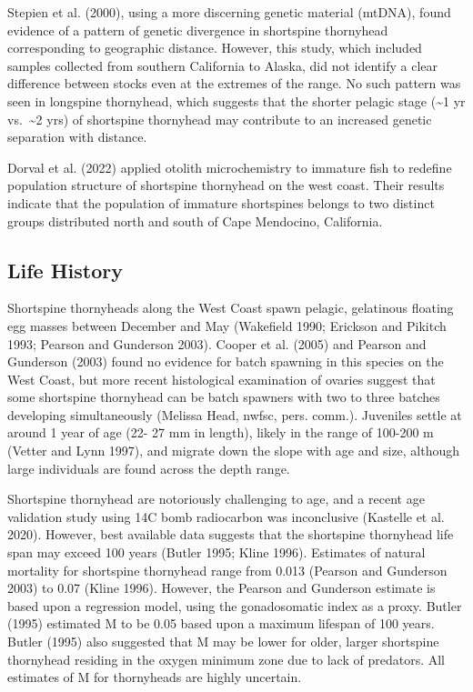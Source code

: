 \documentclass[11pt,
  english,
  letterpaper,
]{article}
\begin{document}
Stepien et al. (2000), using a more discerning genetic material (mtDNA), found evidence of a pattern of genetic divergence in shortspine thornyhead corresponding to geographic distance. However, this study, which included samples collected from southern California to Alaska, did not identify a clear difference between stocks even at the extremes of the range. No such pattern was seen in longspine thornyhead, which suggests that the shorter pelagic stage (\textasciitilde1 yr vs.~\textasciitilde2 yrs) of shortspine thornyhead may contribute to an increased genetic separation with distance.

Dorval et al. (2022) applied otolith microchemistry to immature fish to redefine population structure of shortspine thornyhead on the west coast. Their results indicate that the population of immature shortspines belongs to two distinct groups distributed north and south of Cape Mendocino, California.

\hypertarget{life-history}{%
\subsection{Life History}\label{life-history}}

Shortspine thornyheads along the West Coast spawn pelagic, gelatinous floating egg masses between December and May (Wakefield 1990; Erickson and Pikitch 1993; Pearson and Gunderson 2003). Cooper et al. (2005) and Pearson and Gunderson (2003) found no evidence for batch spawning in this species on the West Coast, but more recent histological examination of ovaries suggest that some shortspine thornyhead can be batch spawners with two to three batches developing simultaneously (Melissa Head, \gls{nwfsc}, pers. comm.). Juveniles settle at around 1 year of age (22- 27 mm in length), likely in the range of 100-200 m (Vetter and Lynn 1997), and migrate down the slope with age and size, although large individuals are found across the depth range.

Shortspine thornyhead are notoriously challenging to age, and a recent age validation study using 14C bomb radiocarbon was inconclusive (Kastelle et al. 2020). However, best available data suggests that the shortspine thornyhead life span may exceed 100 years (Butler 1995; Kline 1996). Estimates of natural mortality for shortspine thornyhead range from 0.013 (Pearson and Gunderson 2003) to 0.07 (Kline 1996). However, the Pearson and Gunderson estimate is based upon a regression model, using the gonadosomatic index as a proxy. Butler (1995) estimated M to be 0.05 based upon a maximum lifespan of 100 years. Butler (1995) also suggested that M may be lower for older, larger shortspine thornyhead residing in the oxygen minimum zone due to lack of predators. All estimates of M for thornyheads are highly uncertain.
\end{document}
